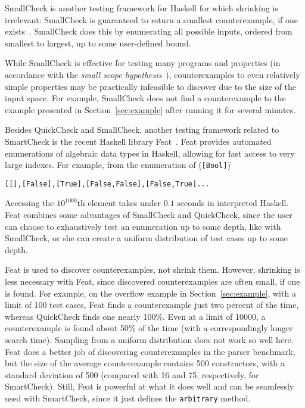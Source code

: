 \documentclass{sigplanconf}
\newenvironment{code}{\begin{alltt}\footnotesize}{\end{alltt}}
\newcommand{\ttp}[1]{\texttt{#1}}
\begin{document}
SmallCheck is another testing framework for Haskell for which shrinking is
irrelevant: SmallCheck is guaranteed to return a smallest counterexample, if
one exists~\cite{sc}.  SmallCheck does this by enumerating all possible inputs,
ordered from smallest to largest, up to some user-defined bound.

While SmallCheck is effective for testing many programs and properties (in
accordance with the \emph{small scope hypothesis}~\cite{jackson}),
counterexamples to even relatively simple properties may be practically
infeasible to discover due to the size of the input space.  For example,
SmallCheck does not find a counterexample to the example presented in
Section~\ref{sec:example} after running it for several minutes.

Besides QuickCheck and SmallCheck, another testing framework related to
SmartCheck is the recent Haskell library Feat~\cite{feat}.  Feat provides
automated enumerations of algebraic data types in Haskell, allowing for fast
access to very large indexes.  For example, from the enumeration of
(\ttp{[Bool]})
%
\begin{code}
[[],[False],[True],[False,False],[False,True] ...
\end{code}
%
\noindent
Accessing the $10^{1000}$th element takes under $0.1$ seconds in interpreted
Haskell.  Feat combines some advantages of SmallCheck and QuickCheck, since the
user can choose to exhaustively test an enumeration up to some depth, like with
SmallCheck, or she can create a uniform distribution of test cases up to some
depth.

Feat is used to discover counterexamples, not shrink them.  However, shrinking
is less necessary with Feat, since discovered counterexamples are often small,
if one is found.  For example, on the overflow example in
Section~\ref{sec:example}, with a limit of 100 test cases, Feat finds a
counterexample just two percent of the time, whereas QuickCheck finds one nearly
100\%.  Even at a limit of 10000, a counterexample is found about 50\% of the
time (with a correspondingly longer search time).  Sampling from a uniform
distribution does not work so well here.  Feat does a better job of discovering
counterexamples in the parser benchmark, but the size of the average
counterexample contains 500 constructors, with a standard deviation of 500
(compared with 16 and 75, respectively, for SmartCheck).  Still, Feat is
powerful at what it does well and can be seamlessly used with SmartCheck, since
it just defines the \ttp{arbitrary} method.
\end{document}
